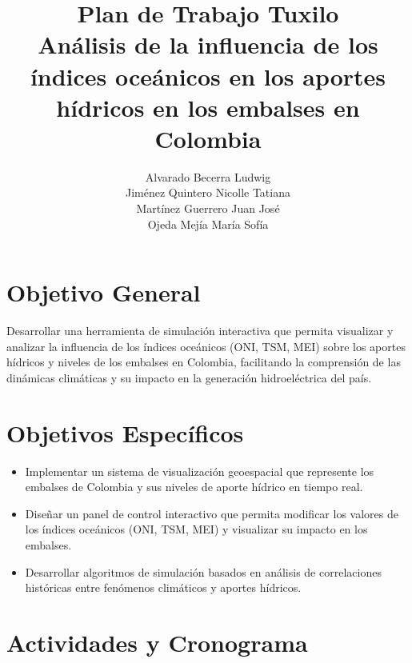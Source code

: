 \documentclass[12pt]{article}
\title{Plan de Trabajo Tuxilo\\
\large Análisis de la influencia de los índices oceánicos en los aportes hídricos en los embalses en Colombia}
\author{Alvarado Becerra Ludwig\\Jiménez Quintero Nicolle Tatiana\\Martínez Guerrero Juan José\\Ojeda Mejía María Sofía}
\date{}
\begin{document}
\maketitle

\section{Objetivo General}
Desarrollar una herramienta de simulación interactiva que permita visualizar y analizar la influencia de los índices oceánicos (ONI, TSM, MEI) sobre los aportes hídricos y niveles de los embalses en Colombia, facilitando la comprensión de las dinámicas climáticas y su impacto en la generación hidroeléctrica del país.

\section{Objetivos Específicos}
\begin{itemize}
    \item Implementar un sistema de visualización geoespacial que represente los embalses de Colombia y sus niveles de aporte hídrico en tiempo real.
    \item Diseñar un panel de control interactivo que permita modificar los valores de los índices oceánicos (ONI, TSM, MEI) y visualizar su impacto en los embalses.
    \item Desarrollar algoritmos de simulación basados en análisis de correlaciones históricas entre fenómenos climáticos y aportes hídricos.
\end{itemize}

\section{Actividades y Cronograma}
\end{document}
